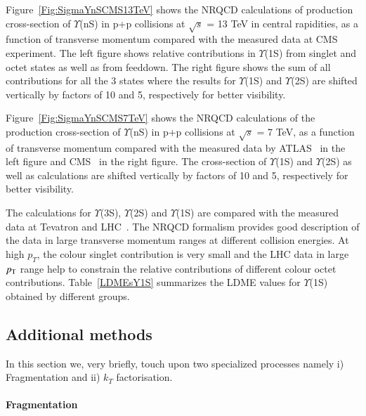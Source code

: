 Figure~\ref{Fig:SigmaYnSCMS13TeV} shows the NRQCD calculations of production cross-section
of $\Upsilon$(nS) in p+p collisions at $\sqrt{s}$ = 13 TeV in central rapidities, as a function of
transverse momentum compared with the measured data at CMS~\cite{CMS:2017dju}
experiment. The left figure shows relative contributions in $\Upsilon$(1S) from
singlet and octet states as well as from feeddown. The right figure shows the sum
of all contributions for all the 3 states where the results for $\Upsilon$(1S) and
$\Upsilon$(2S) are shifted vertically by factors  of 10 and 5, respectively
for better visibility.


Figure~\ref{Fig:SigmaYnSCMS7TeV} shows the NRQCD calculations of the production cross-section
of $\Upsilon$(nS) in p+p collisions at $\sqrt{s}$ = 7 TeV, as a function of transverse momentum compared with
the measured data by ATLAS~\cite{ATLAS:2012lmu} in the left figure and CMS~\cite{CMS:2013qur}
in the right figure. The cross-section of $\Upsilon$(1S) and $\Upsilon$(2S) as well as
calculations are shifted vertically by factors  of 10 and 5, respectively for better visibility.

The calculations for  $\Upsilon$(3S), $\Upsilon$(2S) and $\Upsilon$(1S) are compared with 
the measured data at Tevatron and LHC~\cite{Kumar:2021sek}. The NRQCD formalism provides good description
of the data in large transverse momentum ranges at different collision energies. 
At high $p_T$, the colour singlet contribution is very small and the LHC data in large $p_{\rm T}$ range 
help to constrain the relative contributions of different colour octet contributions.
Table~\ref{LDMEsY1S} summarizes the LDME values for $\Upsilon$(1S) obtained by 
different groups.



\subsection{Additional methods}

In this section we, very briefly, touch upon two specialized processes namely
i) Fragmentation and ii) $k_T$ factorisation. 

\paragraph{Fragmentation}

